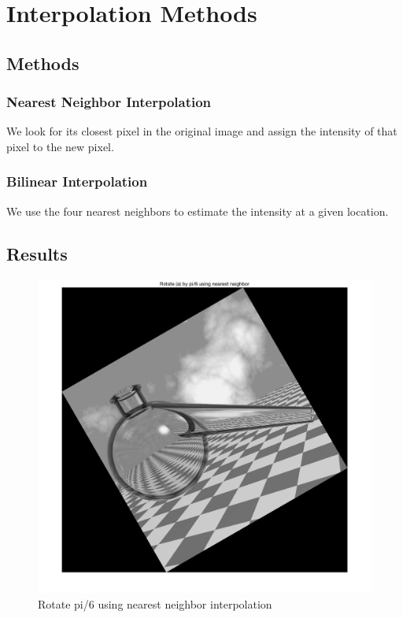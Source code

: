 \documentclass[11pt,oneside]{book}
\begin{document}
\section{Interpolation Methods}
\subsection{Methods}
\subsubsection{Nearest Neighbor Interpolation}
We look for its closest pixel in the original image and assign the intensity of that pixel to the new pixel.
\subsubsection{Bilinear Interpolation}
We use the four nearest neighbors to estimate the intensity at a given location.
\subsection{Results}
\begin{figure}[!htb]
   \centering  
   \includegraphics[width=1\textwidth]{images/6/rotate_nn.jpg}
   \caption{Rotate pi/6 using nearest neighbor interpolation}
\end{figure}
\end{document}
